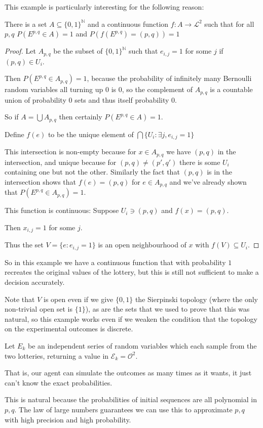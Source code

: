 This example is particularly interesting for the following reason:

\begin{proposition}
There is a set $A \subseteq \{0, 1\}^{\mathbb{N}}$
and a continuous function $f: A \to \mathcal{L}^2$
such that for all $p, q$
$P(E^{p, q} \in A) = 1$
and $P(f(E^{p, q}) = (p, q)) = 1$
\end{proposition}

\begin{proof}
Let $A_{p, q}$
be the subset of $\{0, 1\}^{\mathbb{N}}$
such that $e_{i, j} = 1$
for some $j$
if $(p, q) \in U_i$.

Then $P(E^{p, q} \in A_{p, q}) = 1$,
because the probability of infinitely many Bernoulli random variables all
turning up $0$
is $0$,
so the complement of $A_{p, q}$
is a countable union of probability $0$
sets and thus itself probability $0$.

So if $A = \bigcup A_{p, q}$
then certainly $P(E^{p, q} \in A) = 1$.

Define $f(e)$
to be the unique element of $\bigcap \{U_i: \exists j, e_{i, j} = 1\}$

This intersection is non-empty because for \(x \in A_{p, q}\)
we have $(p, q)$
in the intersection, and unique because for $(p, q) \neq (p', q')$
there is some $U_i$
containing one but not the other. Similarly the fact that $(p, q)$
is in the intersection shows that $f(e) = (p, q)$
for $e \in A_{p, q}$
and we've already shown that $P(E^{p, q} \in A_{p, q}) = 1$.

This function  is continuous: Suppose $U_i \ni (p, q)$
and $f(x) = (p, q)$.

Then $x_{i, j} = 1$
for some $j$.

Thus the set $V = \{e: e_{i, j} = 1\}$
is an open neighbourhood of $x$
with $f(V) \subseteq U_i$.
\end{proof}

So in this example we have a continuous function that with probability $1$
recreates the original values of the lottery, but this is still not
sufficient to make a decision accurately.

Note that $V$ is open even if we give $\{0, 1\}$
the Sierpinski topology (where the only non-trivial open set
is $\{1\}$),
as are the sets that we used to prove that this was natural,
so this example works even if we weaken the condition that
the topology on the experimental outcomes is discrete.

\begin{example}
Let $E_k$ be an independent series of random variables which each sample from the two
lotteries, returning a value in $\mathcal{E}_k = \mathcal{O}^2$.

That is, our agent can simulate
the outcomes as many times as it wants, it just can't know the exact probabilities.

This is natural because the probabilities of initial sequences are all
polynomial in $p, q$.
The law of large numbers guarantees we can use this to approximate $p, q$
with high precision and high probability.
\end{example}

